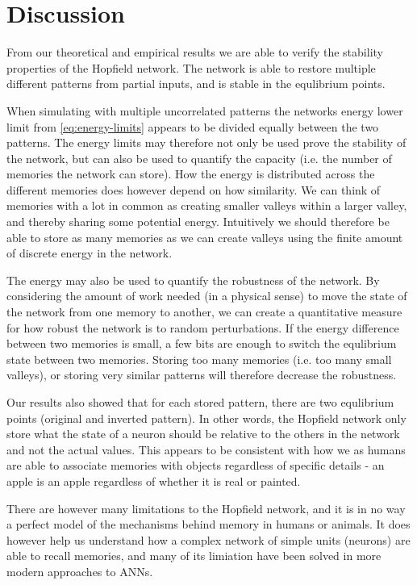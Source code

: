 \section{Discussion}

From our theoretical and empirical results we are able to verify the stability properties of the Hopfield network. The network is able to restore multiple different patterns from partial inputs, and is stable in the equlibrium points. 

When simulating with multiple uncorrelated patterns the networks energy lower limit from \cref{eq:energy-limits} appears to be divided equally between the two patterns. The energy limits may therefore not only be used prove the stability of the network, but can also be used to quantify the capacity (i.e. the number of memories the network can store). How the energy is distributed across the different memories does however depend on how similarity. We can think of memories with a lot in common as creating smaller valleys within a larger valley, and thereby sharing some potential energy. Intuitively we should therefore be able to store as many memories as we can create valleys using the finite amount of discrete energy in the network. 

The energy may also be used to quantify the robustness of the network. By considering the amount of work needed (in a physical sense) to move the state of the network from one memory to another, we can create a quantitative measure for how robust the network is to random perturbations. If the energy difference between two memories is small, a few bits are enough to switch the equlibrium state between two memories. Storing too many memories (i.e. too many small valleys), or storing very similar patterns will therefore decrease the robustness.

Our results also showed that for each stored pattern, there are two equlibrium points (original and inverted pattern).  In other words, the Hopfield network only store what the state of a neuron should be relative to the others in the network and not the actual values. This appears to be consistent with how we as humans are able to associate memories with objects regardless of specific details - an apple is an apple regardless of whether it is real or painted.

There are however many limitations to the Hopfield network, and it is in no way a perfect model of the mechanisms behind memory in humans or animals. It does however help us understand how a complex network of simple units (neurons) are able to recall memories, and many of its limiation have been solved in more modern approaches to ANNs.







